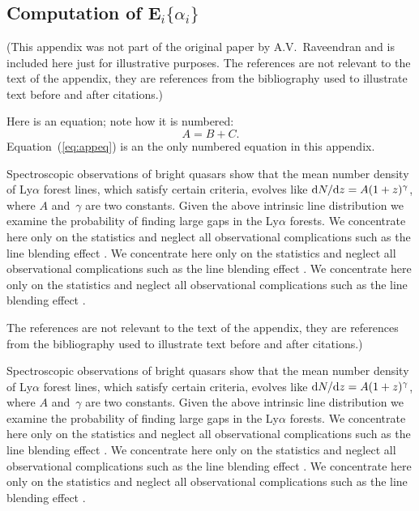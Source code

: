 \documentclass[useAMS,usenatbib]{biom}
\begin{document}
\appendix

\section{}
\subsection{Computation of E$_i\{\alpha_i\}$}

(This appendix was not part of the original paper by
A.V.~Raveendran and is included here just for illustrative
purposes. The references are not relevant to the text of the
appendix, they are references from the bibliography used to
illustrate text before and after citations.)

Here is an equation; note how it is numbered:
\begin{equation}
A = B+C. 
\label{eq:appeq}
\end{equation}
Equation~(\ref{eq:appeq}) is an the only numbered equation in this appendix.

Spectroscopic observations of bright quasars show that the mean
number density of Ly$\alpha$ forest lines, which satisfy certain
criteria, evolves like ${\mathrm{d}}N/{\mathrm{d}}z=A(1+z)^\gamma$, where
$A$ and~$\gamma$ are two constants.  Given the above intrinsic
line distribution we examine the probability of finding large gaps
in the Ly$\alpha$ forests.  We concentrate here only on the
statistics and neglect all observational complications such as the
line blending effect \citep[see][for example]{b11}. We concentrate here only on the
statistics and neglect all observational complications such as the
line blending effect \citep[see][for example]{b11}. We concentrate here only on the
statistics and neglect all observational complications such as the
line blending effect \citep[see][for example]{b11}. 

The references are not relevant to the text of the
appendix, they are references from the bibliography used to
illustrate text before and after citations.)

Spectroscopic observations of bright quasars show that the mean
number density of Ly$\alpha$ forest lines, which satisfy certain
criteria, evolves like ${\mathrm{d}}N/{\mathrm{d}}z=A(1+z)^\gamma$, where
$A$ and~$\gamma$ are two constants.  Given the above intrinsic
line distribution we examine the probability of finding large gaps
in the Ly$\alpha$ forests.  We concentrate here only on the
statistics and neglect all observational complications such as the
line blending effect \citep[see][for example]{b11}. We concentrate here only on the
statistics and neglect all observational complications such as the
line blending effect \citep[see][for example]{b11}. We concentrate here only on the
statistics and neglect all observational complications such as the
line blending effect \citep[see][for example]{b11}. \vadjust{\vfill\pagebreak}
\end{document}
